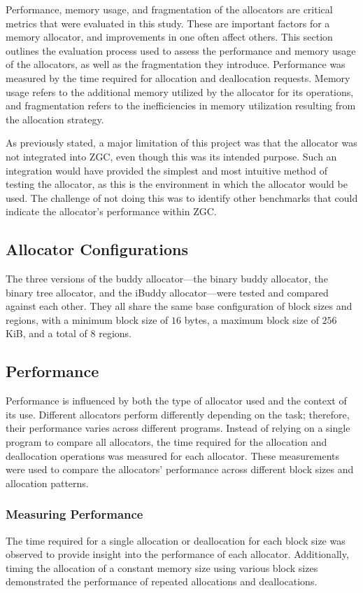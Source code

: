 Performance, memory usage, and fragmentation of the allocators are critical metrics that were evaluated in this study. These are important factors for a memory allocator, and improvements in one often affect others. This section outlines the evaluation process used to assess the performance and memory usage of the allocators, as well as the fragmentation they introduce. Performance was measured by the time required for allocation and deallocation requests. Memory usage refers to the additional memory utilized by the allocator for its operations, and fragmentation refers to the inefficiencies in memory utilization resulting from the allocation strategy.

As previously stated, a major limitation of this project was that the allocator was not integrated into ZGC, even though this was its intended purpose. Such an integration would have provided the simplest and most intuitive method of testing the allocator, as this is the environment in which the allocator would be used. The challenge of not doing this was to identify other benchmarks that could indicate the allocator's performance within ZGC.

\subsection{Allocator Configurations}
The three versions of the buddy allocator---the binary buddy allocator, the binary tree allocator, and the iBuddy allocator---were tested and compared against each other. They all share the same base configuration of block sizes and regions, with a minimum block size of $16$ bytes, a maximum block size of $256$ KiB, and a total of $8$ regions.

\subsection{Performance}
Performance is influenced by both the type of allocator used and the context of its use. Different allocators perform differently depending on the task; therefore, their performance varies across different programs. Instead of relying on a single program to compare all allocators, the time required for the allocation and deallocation operations was measured for each allocator. These measurements were used to compare the allocators' performance across different block sizes and allocation patterns.

\subsubsection{Measuring Performance} \label{sec:perfmeas}
The time required for a single allocation or deallocation for each block size was observed to provide insight into the performance of each allocator. Additionally, timing the allocation of a constant memory size using various block sizes demonstrated the performance of repeated allocations and deallocations.

